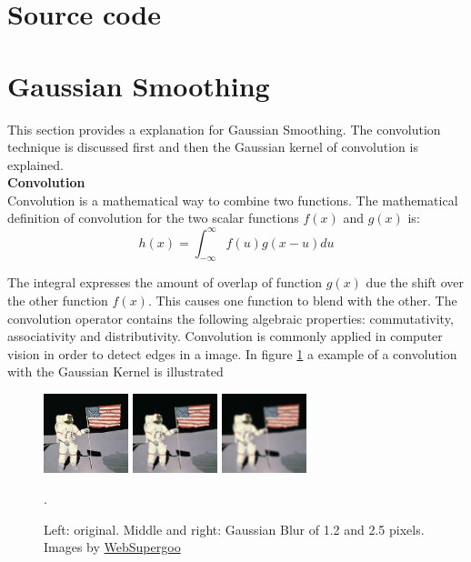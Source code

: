 \documentclass[a4paper]{article}
\begin{document}
\begin{appendices}
\section{Source code}

\newpage
\section{Gaussian Smoothing}
This section provides a explanation for Gaussian Smoothing. The convolution technique is discussed first and then the Gaussian kernel of convolution is explained.\\

\noindent\textbf{Convolution}\\
Convolution is a mathematical way to combine two functions. The mathematical definition of convolution for the two scalar functions $f(x)$ and $g(x)$ is:
\begin{equation*}
h(x) = \int_{-\infty}^\infty f(u)g(x - u)du
\end{equation*}

The integral expresses the amount of overlap of function $g(x)$
due the shift over the other function $f(x)$. This causes one function to blend with the other. The convolution operator contains the following algebraic properties: commutativity, associativity and distributivity. Convolution is commonly applied in computer vision in order to detect edges in a image. In figure \ref{gaussianblur} a example of a convolution with the Gaussian Kernel is illustrated
\begin{figure}[!ht]
\centering
\includegraphics[width=0.22\textwidth]{images/gaussianblur_before.jpg}
\includegraphics[width=0.22\textwidth]{images/gaussianblur_after1.jpg}
\includegraphics[width=0.22\textwidth]{images/gaussianblur_after2.jpg}
\caption[Gaussian Blur]{Left: original. Middle and right: Gaussian Blur of 1.2 and 2.5 pixels. Images by \href{http://www.websupergoo.com/helpie/}{WebSupergoo}}.
\label{gaussianblur}
\end{figure}


\end{appendices}
\end{document}
